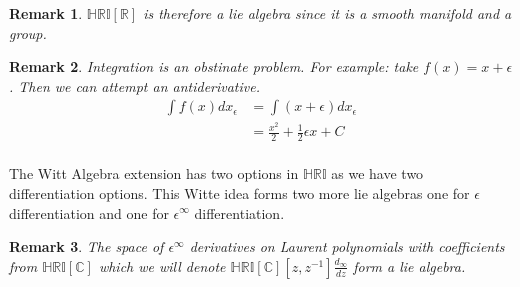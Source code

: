 \documentclass[10pt, oneside]{article}
\newcommand{\R}{\mathbb{R}}
\newcommand{\C}{\mathbb{C}}
\newcommand{\HRI}{\mathbb{HRI}}
\newtheorem{rem}{Remark}
\begin{document}
\begin{rem}
    $\HRI[\R]$ is therefore a lie algebra since it is a smooth manifold and a group.
\end{rem}
\begin{rem}
    Integration is an obstinate problem. For example: take $f(x) = x + \epsilon$. Then we can attempt an antiderivative. 
    \begin{align*}
        \int f(x) dx_{\epsilon} &= \int (x + \epsilon)dx_{\epsilon} \\
        & = \frac{x^{2}}{2} + \frac{1}{2} \epsilon x + C\\
    \end{align*}
\end{rem}
The Witt Algebra extension \cite{Kac1990} has two options in $\HRI$ as we have two differentiation options. This Witte idea forms two more lie algebras one for $\epsilon$ differentiation and one for $\epsilon^{\infty}$ differentiation. 
\begin{rem}
    The space of $\epsilon^{\infty}$ derivatives on Laurent polynomials with coefficients from $\HRI[\C]$ which we will denote $\HRI[\C][z,z^{-1}]\frac{d_{\infty}}{dz}$ form a lie algebra.
\end{rem}
\end{document}
